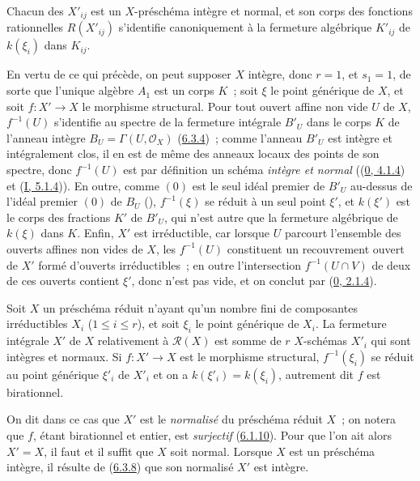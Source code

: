 
\begin{proposition}[6.3.7]
\label{II.6.3.7-fr}
Chacun des $X'_{ij}$ est un $X$-préschéma intègre et normal, et son corps des
fonctions rationnelles $R(X'_{ij})$ s'identifie canoniquement à la fermeture
algébrique $K'_{ij}$ de $k(\xi_i)$ dans $K_{ij}$.
\end{proposition}

En vertu de ce qui précède, on peut supposer $X$ intègre, donc $r=1$, et
$s_1=1$, de sorte que l'unique algèbre $A_1$ est un corps $K$~; soit $\xi$ le
point générique de $X$, et soit $f:X'\to X$ le morphisme structural. Pour tout
ouvert affine non vide $U$ de $X$, $f^{-1}(U)$ s'identifie au spectre de la
fermeture intégrale $B'_U$ dans le corps $K$ de l'anneau intègre
$B_U=\Gamma(U,\mathcal{O}_X)$ (\hyperref[II.6.3.4-fr]{6.3.4})~; comme l'anneau
$B'_U$ est intègre et intégralement clos, il en est de même des anneaux locaux
des points de son spectre, donc $f^{-1}(U)$ est par définition un schéma
\emph{intègre et normal} ((\hyperref[0.4.1.4-fr]{0, 4.1.4}) et
(\hyperref[I.5.1.4-fr]{I, 5.1.4})). En outre, comme $(0)$ est le seul idéal
premier de $B'_U$ au-dessus de l'idéal premier $(0)$ de $B_U$
(\cite[t.~I, p.~259]{I-13}), $f^{-1}(\xi)$ se réduit à un seul point $\xi'$,
et $k(\xi')$ est le corps des fractions $K'$ de $B'_U$, qui n'est autre que la
fermeture algébrique de $k(\xi)$ dans $K$. Enfin, $X'$ est irréductible, car
lorsque $U$ parcourt l'ensemble des ouverts affines non vides de $X$, les
$f^{-1}(U)$ constituent un recouvrement ouvert de $X'$ formé d'ouverts
irréductibles~; en outre l'intersection $f^{-1}(U\cap V)$ de deux de ces
ouverts contient $\xi'$, donc n'est pas vide, et on conclut par
(\hyperref[0.2.1.4-fr]{0, 2.1.4}).

\begin{corollary}[6.3.8]
\label{II.6.3.8-fr}
Soit $X$ un préschéma réduit n'ayant qu'un nombre fini de composantes
irréductibles $X_i$ ($1\leq i\leq r$), et soit $\xi_i$ le point générique de
$X_i$. La fermeture intégrale $X'$ de $X$ relativement à $\mathcal{R}(X)$ est
somme de $r$ $X$-schémas $X'_i$ qui sont intègres et normaux. Si $f:X'\to X$
est le morphisme structural, $f^{-1}(\xi_i)$ se réduit au point générique
$\xi'_i$ de $X'_i$ et on a $k(\xi'_i)=k(\xi_i)$, autrement dit $f$ est
birationnel.
\end{corollary}

On dit dans ce cas que $X'$ est le \emph{normalisé} du préschéma réduit $X$~;
on notera que $f$, étant birationnel et entier, est \emph{surjectif}
(\hyperref[II.6.1.10-fr]{6.1.10}). Pour que l'on ait alors $X'=X$, il faut et
il suffit que $X$ soit normal. Lorsque $X$ est un préschéma intègre, il résulte
de (\hyperref[II.6.3.8-fr]{6.3.8}) que son normalisé $X'$ est intègre.

